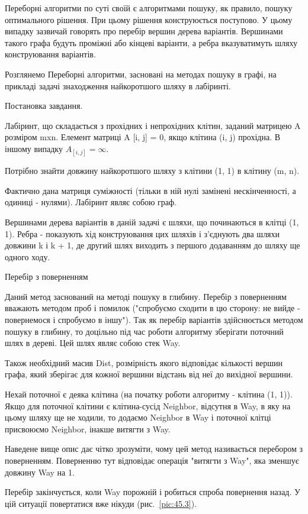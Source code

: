 Переборні алгоритми по суті своїй є алгоритмами пошуку, як правило, пошуку оптимального рішення. При цьому рішення конструюється поступово. У цьому випадку зазвичай говорять про перебір вершин дерева варіантів. Вершинами такого графа будуть проміжні або кінцеві варіанти, а ребра вказуватимуть шляху конструювання варіантів.

Розглянемо Переборні алгоритми, засновані на методах пошуку в графі, на прикладі задачі знаходження найкоротшого шляху в лабіринті.

Постановка завдання.

Лабіринт, що складається з прохідних і непрохідних клітин, заданий матрицею A розміром mxn. Елемент матриці A [i, j] = 0, якщо клітина (i, j) прохідна. В іншому випадку $A_{[i, j]} = \infty $.

Потрібно знайти довжину найкоротшого шляху з клітини (1, 1) в клітину (m, n).

Фактично дана матриця суміжності (тільки в ній нулі замінені нескінченності, а одиниці - нулями). Лабіринт являє собою граф.

Вершинами дерева варіантів в даній задачі є шляхи, що починаються в клітці (1, 1). Ребра - показують хід конструювання цих шляхів і з'єднують два шляхи довжини k і k + 1, де другий шлях виходить з першого додаванням до шляху ще одного ходу.

Перебір з поверненням

Даний метод заснований на методі пошуку в глибину. Перебір з поверненням вважають методом проб і помилок ("спробуємо сходити в цю сторону: не вийде - повернемося і спробуємо в іншу"). Так як перебір варіантів здійснюється методом пошуку в глибину, то доцільно під час роботи алгоритму зберігати поточний шлях в дереві. Цей шлях являє собою стек Way.

Також необхідний масив Dist, розмірність якого відповідає кількості вершин графа, який зберігає для кожної вершини відстань від неї до вихідної вершини.

Нехай поточної є деяка клітина (на початку роботи алгоритму - клітина (1, 1)). Якщо для поточної клітини є клітина-сусід Neighbor, відсутня в Way, в яку на цьому шляху ще не ходили, то додаємо Neighbor в Way і поточної клітці присвоюємо Neighbor, інакше витягти з Way.

Наведене вище опис дає чітко зрозуміти, чому цей метод називається перебором з поверненням. Поверненню тут відповідає операція "витягти з Way", яка зменшує довжину Way на 1.

Перебір закінчується, коли Way порожній і робиться спроба повернення назад. У цій ситуації повертатися вже нікуди (рис.~\ref{pic:45.3}).


